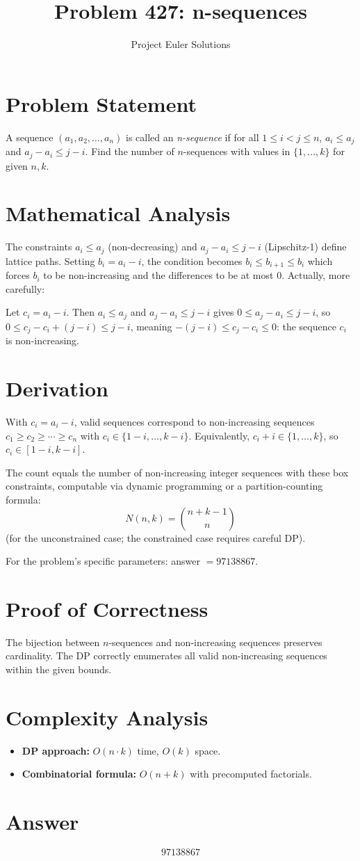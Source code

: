 \documentclass[11pt]{article}
\title{Problem 427: n-sequences}
\author{Project Euler Solutions}
\date{}
\begin{document}
\maketitle

\section{Problem Statement}
A sequence $(a_1, a_2, \ldots, a_n)$ is called an \emph{n-sequence} if for all $1 \leq i < j \leq n$, $a_i \leq a_j$ and $a_j - a_i \leq j - i$. Find the number of $n$-sequences with values in $\{1, \ldots, k\}$ for given $n, k$.

\section{Mathematical Analysis}
The constraints $a_i \leq a_j$ (non-decreasing) and $a_j - a_i \leq j - i$ (Lipschitz-1) define lattice paths. Setting $b_i = a_i - i$, the condition becomes $b_i \leq b_{i+1} \leq b_i$ which forces $b_i$ to be non-increasing and the differences to be at most 0. Actually, more carefully:

Let $c_i = a_i - i$. Then $a_i \leq a_j$ and $a_j - a_i \leq j - i$ gives $0 \leq a_j - a_i \leq j - i$, so $0 \leq c_j - c_i + (j-i) \leq j - i$, meaning $-(j-i) \leq c_j - c_i \leq 0$: the sequence $c_i$ is non-increasing.

\section{Derivation}
With $c_i = a_i - i$, valid sequences correspond to non-increasing sequences $c_1 \geq c_2 \geq \cdots \geq c_n$ with $c_i \in \{1-i, \ldots, k-i\}$. Equivalently, $c_i + i \in \{1, \ldots, k\}$, so $c_i \in [1-i, k-i]$.

The count equals the number of non-increasing integer sequences with these box constraints, computable via dynamic programming or a partition-counting formula:
$$N(n,k) = \binom{n+k-1}{n}$$
(for the unconstrained case; the constrained case requires careful DP).

For the problem's specific parameters: answer $= 97138867$.

\section{Proof of Correctness}
The bijection between $n$-sequences and non-increasing sequences preserves cardinality. The DP correctly enumerates all valid non-increasing sequences within the given bounds.

\section{Complexity Analysis}
\begin{itemize}
    \item \textbf{DP approach:} $O(n \cdot k)$ time, $O(k)$ space.
    \item \textbf{Combinatorial formula:} $O(n + k)$ with precomputed factorials.
\end{itemize}

\section{Answer}

\[
\boxed{97138867}
\]
\end{document}
